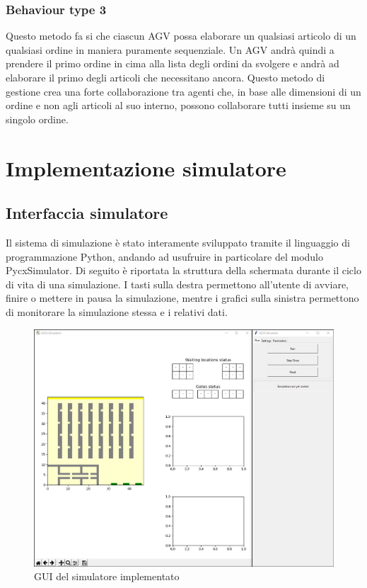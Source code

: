 \documentclass[12pt]{article}
\begin{document}
\subsubsection{Behaviour type 3}
Questo metodo fa si che ciascun AGV possa elaborare un qualsiasi articolo di un qualsiasi ordine in maniera puramente sequenziale. Un AGV andrà quindi a prendere il primo ordine in cima alla lista degli ordini da svolgere e andrà ad elaborare il primo degli articoli che necessitano ancora. Questo metodo di gestione crea una forte collaborazione tra agenti che, in base alle dimensioni di un ordine e non agli articoli al suo interno, possono collaborare tutti insieme su un singolo ordine.
\newpage
\section{Implementazione simulatore} 
\subsection{Interfaccia simulatore}
Il sistema di simulazione è stato interamente sviluppato tramite il linguaggio di programmazione Python, andando ad usufruire in particolare del modulo PycxSimulator.
Di seguito è riportata la struttura della schermata durante il ciclo di vita di una simulazione. I tasti sulla destra permettono all'utente di avviare, finire o mettere in pausa la simulazione, mentre i grafici sulla sinistra permettono di monitorare la simulazione stessa e i relativi dati.
\begin{figure}[h]
\centering
\includegraphics[width=1\textwidth,height=\textheight,keepaspectratio]{Figures/GUI/Simulatore.jpg}
\caption[GUI del simulatore implementato]{GUI del simulatore implementato}
\label{fig:Simulatore}
\end{figure}
\end{document}
